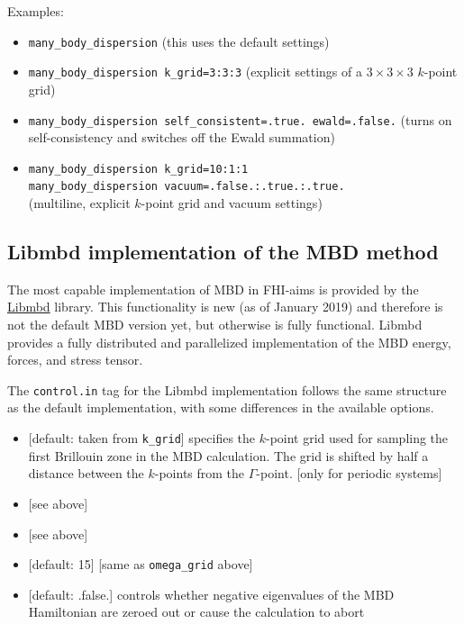 Examples:
\begin{itemize}
    \item \verb+many_body_dispersion+ (this uses the default settings)
    \item \verb+many_body_dispersion k_grid=3:3:3+ (explicit settings of a $3\times3\times3$ $k$-point grid)
    \item \verb+many_body_dispersion self_consistent=.true. ewald=.false.+ (turns on self-consistency and switches off the Ewald summation)
    \item \verb+many_body_dispersion k_grid=10:1:1+\\
          \verb+many_body_dispersion vacuum=.false.:.true.:.true.+\\
          (multiline, explicit $k$-point grid and vacuum settings)
\end{itemize}

\subsection*{Libmbd implementation of the MBD method}

The most capable implementation of MBD in FHI-aims is provided by the
\href{https://github.com/azag0/libmbd}{Libmbd} library. This functionality is
new (as of January 2019) and therefore is not the default MBD version yet, but
otherwise is fully functional. Libmbd provides a fully distributed and
parallelized implementation of the MBD energy, forces, and stress tensor.

The \texttt{control.in} tag for the Libmbd implementation follows the same structure as the default implementation, with some differences in the available options.


\begin{itemize}
  \item {} [default: taken from
    \texttt{k\_grid}] specifies the $k$-point grid used for sampling
  the first Brillouin zone in the MBD calculation. The grid is shifted
  by half a distance between the $k$-points from the
  $\Gamma$-point. [only for periodic systems] 
  \item {} [see above]
  \item {} [see above]
  \item {} [default: 15] [same as \texttt{omega\_grid} above]
  \item {} [default: .false.] controls whether negative eigenvalues of the MBD Hamiltonian are zeroed out or cause the calculation to abort
\end{itemize}


